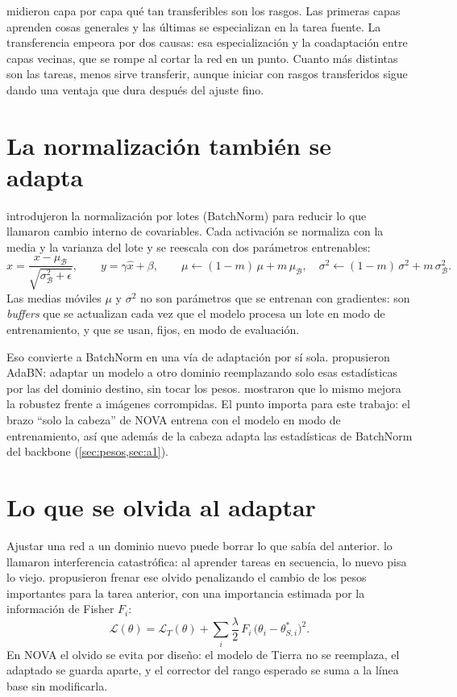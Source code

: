 \textcite{yosinski2014} midieron capa por capa qué tan transferibles son los rasgos. Las primeras capas aprenden cosas
generales y las últimas se especializan en la tarea fuente. La transferencia empeora por dos causas: esa
especialización y la coadaptación entre capas vecinas, que se rompe al cortar la red en un punto. Cuanto más distintas
son las tareas, menos sirve transferir, aunque iniciar con rasgos transferidos sigue dando una ventaja que dura después
del ajuste fino.

\section{La normalización también se adapta}\label{sec:bn}

\textcite{ioffe2015} introdujeron la normalización por lotes (BatchNorm) para reducir lo que llamaron cambio interno de
covariables. Cada activación se normaliza con la media y la varianza del lote y se reescala con dos parámetros
entrenables:
\begin{equation}\label{eq:bn}
\hat{x} = \frac{x - \mu_{\mathcal{B}}}{\sqrt{\sigma^2_{\mathcal{B}} + \epsilon}}, \qquad y = \gamma \hat{x} + \beta,
\qquad \mu \leftarrow (1-m)\,\mu + m\,\mu_{\mathcal{B}}, \quad \sigma^2 \leftarrow (1-m)\,\sigma^2 + m\,\sigma^2_{\mathcal{B}}.
\end{equation}
Las medias móviles $\mu$ y $\sigma^2$ no son parámetros que se entrenan con gradientes: son \emph{buffers} que se
actualizan cada vez que el modelo procesa un lote en modo de entrenamiento, y que se usan, fijos, en modo de
evaluación.

Eso convierte a BatchNorm en una vía de adaptación por sí sola. \textcite{li2018adabn} propusieron AdaBN: adaptar un
modelo a otro dominio reemplazando solo esas estadísticas por las del dominio destino, sin tocar los pesos.
\textcite{schneider2020} mostraron que lo mismo mejora la robustez frente a imágenes corrompidas. El punto importa para
este trabajo: el brazo \enquote{solo la cabeza} de NOVA entrena con el modelo en modo de entrenamiento, así que además
de la cabeza adapta las estadísticas de BatchNorm del backbone (\cref{sec:pesos,sec:a1}).

\section{Lo que se olvida al adaptar}

Ajustar una red a un dominio nuevo puede borrar lo que sabía del anterior. \textcite{mccloskey1989} lo llamaron
interferencia catastrófica: al aprender tareas en secuencia, lo nuevo pisa lo viejo. \textcite{kirkpatrick2017}
propusieron frenar ese olvido penalizando el cambio de los pesos importantes para la tarea anterior, con una
importancia estimada por la información de Fisher $F_i$:
\begin{equation}
\mathcal{L}(\theta) = \mathcal{L}_T(\theta) + \sum_i \frac{\lambda}{2}\, F_i\, \bigl(\theta_i - \theta^{*}_{S,i}\bigr)^2 .
\end{equation}
En NOVA el olvido se evita por diseño: el modelo de Tierra no se reemplaza, el adaptado se guarda aparte, y el
corrector del rango esperado se suma a la línea base sin modificarla.


